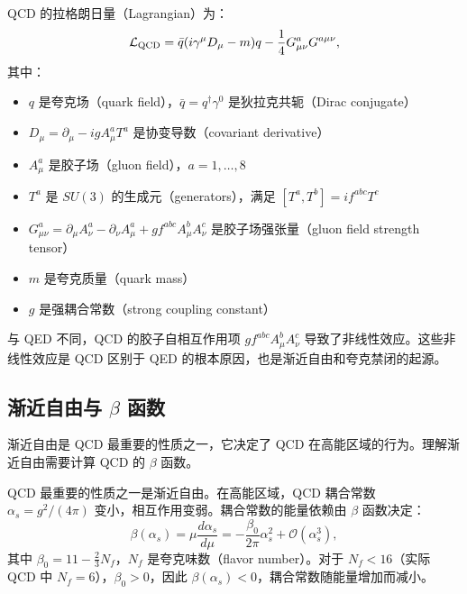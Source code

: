 \begin{definition}
QCD 的拉格朗日量（Lagrangian）为：
\begin{equation}
    \mathcal{L}_{\rm QCD} = \bar{q}(i\gamma^\mu D_\mu - m)q - \frac{1}{4}G_{\mu\nu}^a G^{a\mu\nu},
\end{equation}
其中：
\begin{itemize}
    \item $q$ 是夸克场（quark field），$\bar{q} = q^\dagger \gamma^0$ 是狄拉克共轭（Dirac conjugate）
    \item $D_\mu = \partial_\mu - igA_\mu^a T^a$ 是协变导数（covariant derivative）
    \item $A_\mu^a$ 是胶子场（gluon field），$a = 1, \ldots, 8$
    \item $T^a$ 是 $SU(3)$ 的生成元（generators），满足 $[T^a, T^b] = if^{abc}T^c$
    \item $G_{\mu\nu}^a = \partial_\mu A_\nu^a - \partial_\nu A_\mu^a + gf^{abc}A_\mu^b A_\nu^c$ 是胶子场强张量（gluon field strength tensor）
    \item $m$ 是夸克质量（quark mass）
    \item $g$ 是强耦合常数（strong coupling constant）
\end{itemize}
\end{definition}

\begin{remark}
与 QED 不同，QCD 的胶子自相互作用项 $gf^{abc}A_\mu^b A_\nu^c$ 导致了非线性效应。这些非线性效应是 QCD 区别于 QED 的根本原因，也是渐近自由和夸克禁闭的起源。
\end{remark}

\subsection{渐近自由与 $\beta$ 函数}

渐近自由是 QCD 最重要的性质之一，它决定了 QCD 在高能区域的行为。理解渐近自由需要计算 QCD 的 $\beta$ 函数。

\begin{property}[渐近自由]
QCD 最重要的性质之一是渐近自由。在高能区域，QCD 耦合常数 $\alpha_s = g^2/(4\pi)$ 变小，相互作用变弱。耦合常数的能量依赖由 $\beta$ 函数决定：
\begin{equation}
    \beta(\alpha_s) = \mu \frac{d\alpha_s}{d\mu} = -\frac{\beta_0}{2\pi} \alpha_s^2 + \mathcal{O}(\alpha_s^3),
\end{equation}
其中 $\beta_0 = 11 - \frac{2}{3}N_f$，$N_f$ 是夸克味数（flavor number）。对于 $N_f < 16$（实际 QCD 中 $N_f = 6$），$\beta_0 > 0$，因此 $\beta(\alpha_s) < 0$，耦合常数随能量增加而减小。
\end{property}

